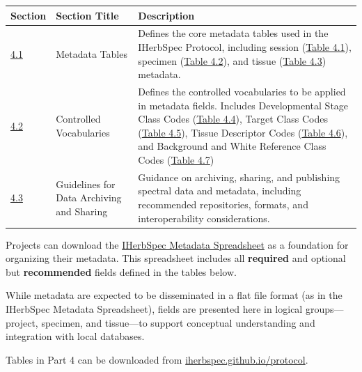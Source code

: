 \documentclass[
  letterpaper,
  DIV=11,
  numbers=noendperiod]{scrreprt}
\begin{document}
\begin{longtable}[]{@{}
  >{\raggedright\arraybackslash}p{}
  >{\raggedright\arraybackslash}p{}
  >{\raggedright\arraybackslash}p{}@{}}
\toprule\noalign{}
\begin{minipage}[b]{\linewidth}\raggedright
Section
\end{minipage} & \begin{minipage}[b]{\linewidth}\raggedright
Section Title
\end{minipage} & \begin{minipage}[b]{\linewidth}\raggedright
Description
\end{minipage} \\
\midrule\noalign{}
\endhead
\bottomrule\noalign{}
\endlastfoot
\hyperref[section4-1]{4.1} & Metadata Tables & Defines the core metadata
tables used in the IHerbSpec Protocol, including session
(\hyperref[tbl-4-1]{Table 4.1}), specimen (\hyperref[tbl-4-2]{Table
4.2}), and tissue (\hyperref[tbl-4-3]{Table 4.3}) metadata. \\
\hyperref[section4-2]{4.2} & Controlled Vocabularies & Defines the
controlled vocabularies to be applied in metadata fields. Includes
Developmental Stage Class Codes (\hyperref[tbl-4-4]{Table 4.4}), Target
Class Codes (\hyperref[tbl-4-5]{Table 4.5}), Tissue Descriptor Codes
(\hyperref[tbl-4-6]{Table 4.6}), and Background and White Reference
Class Codes (\hyperref[tbl-4-7]{Table 4.7}) \\
\hyperref[section4-3]{4.3} & Guidelines for Data Archiving and Sharing &
Guidance on archiving, sharing, and publishing spectral data and
metadata, including recommended repositories, formats, and
interoperability considerations. \\
\end{longtable}

Projects can download the \href{tables/IHerbSpec_metadata.csv}{IHerbSpec
Metadata Spreadsheet} as a foundation for organizing their metadata.
This spreadsheet includes all \textbf{required} and optional but
\textbf{recommended} fields defined in the tables below.

While metadata are expected to be disseminated in a flat file format (as
in the IHerbSpec Metadata Spreadsheet), fields are presented here in
logical groups---project, specimen, and tissue---to support conceptual
understanding and integration with local databases.

Tables in Part 4 can be downloaded from
\href{https://iherbspec.github.io/protocol}{iherbspec.github.io/protocol}.
\end{document}
